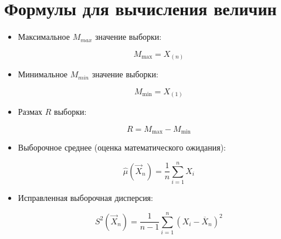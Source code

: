 \chapter{Формулы для вычисления величин}

\begin{itemize}

	\item Максимальное $M_{max}$ значение выборки:

	$$ M_{\max} = X_{(n)} $$

	\item Минимальное $M_{min}$ значение выборки:

	$$ M_{\min} = X_{(1)} $$

	\item Размах $R$ выборки:

	$$ R = M_{\max} - M_{\min} $$

    \item Выборочное среднее (оценка математического ожидания):

    $$ \hat\mu(\vec X_n) = \frac 1n \sum_{i=1}^n X_i $$
    
    \item Исправленная выборочная дисперсия:

    
    $$ S^2(\vec X_n) = \frac 1{n-1} \sum_{i=1}^n (X_i-\overline X_n)^2 $$

\end{itemize}